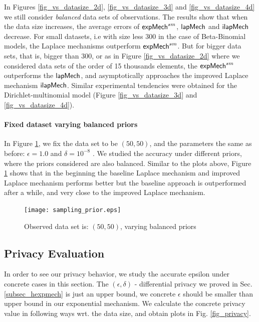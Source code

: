 \documentclass{article}
\begin{document}
In Figures \ref{fig_vs_datasize_2d}, \ref{fig_vs_datasize_3d} and \ref{fig_vs_datasize_4d} we still consider \emph{balanced} data sets
of observations. The results show that when the data size increases, the average errors of
$\mathsf{expMech}^{sm}$, $\mathsf{lapMech}$ and $\mathsf{ilapMech}$ decrease. For small datasets,
i.e with size less $300$ in the case of Beta-Binomial models, the Laplace mechanisms outperform $\mathsf{expMech}^{sm}$.
But for bigger data sets, that is, bigger than $300$, or as in Figure \ref{fig_vs_datasize_2d} where
we considered data sets of the order of 15 thousands elements,
the $\mathsf{expMech}^{sm}$ outperforms the $\mathsf{lapMech}$, and asymptotically approaches the improved Laplace mechanism $\mathsf{ilapMech}$.
Similar experimental tendencies were obtained for the Dirichlet-multinomial model (Figure \ref{fig_vs_datasize_3d} and \ref{fig_vs_datasize_4d}).


\paragraph{Fixed dataset varying balanced priors}
\label{subsubsec_vs_prior}
In Figure \ref{fig_vs_prior}, we fix the data set to be $(50,50)$, and the parameters the same as before: $\epsilon = 1.0$ and $\delta = 10^{-8}$ . We studied the accuracy under different priors, where the priors considered  are also balanced.
Similar to the plots above, Figure \ref{fig_vs_prior} shows that in the beginning the baseline Laplace mechanism and improved Laplace mechanism performs better but the baseline approach is outperformed after a while, and very close to the improved Laplace mechanism.
\begin{figure}
\centering
\texttt{[image: sampling\_prior.eps]}
\caption{Observed data set is: $(50,50)$, varying balanced priors}
\label{fig_vs_prior}
\end{figure}

\subsection{Privacy Evaluation}
\label{subsec_experiment_privacy}
In order to see our privacy behavior, we study the accurate epsilon under concrete cases in this section. The $(\epsilon, \delta)$ - differential privacy we proved in Sec. \ref{subsec_hexpmech} is just an upper bound, we concrete $\epsilon$ should be smaller than upper bound in our exponential mechanism. We calculate the concrete privacy value in following ways wrt. the data size, and obtain plots in Fig. \ref{fig_privacy}.
\end{document}
